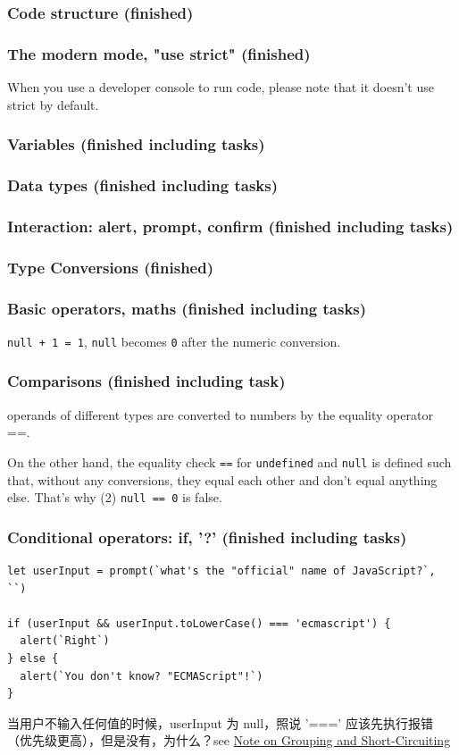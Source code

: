 \documentclass[a4paper, 12pt]{article}
\begin{document}
\subsubsection{Code structure (finished)}
\subsubsection{The modern mode, "use strict" (finished)}
When you use a developer console to run code, please note that it doesn't use strict by default.

\subsubsection{Variables (finished including tasks)}

\subsubsection{Data types (finished including tasks)}

\subsubsection{Interaction: alert, prompt, confirm (finished including tasks)}
\subsubsection{Type Conversions (finished)}
\subsubsection{Basic operators, maths (finished including tasks)}
\verb|null + 1 = 1|, \verb|null| becomes \verb|0| after the numeric conversion.

\subsubsection{Comparisons (finished including task)}
operands of different types are converted to numbers by the equality operator ==.

On the other hand, the equality check \verb|==| for \verb|undefined| and \verb|null| is defined such that, without any conversions, they equal each other and don't equal anything else. That's why (2) \verb|null == 0| is false.

\subsubsection{Conditional operators: if, '?' (finished including tasks)}
\begin{verbatim}
let userInput = prompt(`what's the "official" name of JavaScript?`, ``)

if (userInput && userInput.toLowerCase() === 'ecmascript') {
  alert(`Right`)
} else {
  alert(`You don't know? "ECMAScript"!`)
}
\end{verbatim}
当用户不输入任何值的时候，userInput 为 null，照说 '===' 应该先执行报错（优先级更高），但是没有，为什么？see \href{https://developer.mozilla.org/en-US/docs/Web/JavaScript/Reference/Operators/Operator_Precedence#Note_on_grouping_and_short-circuiting}{Note on Grouping and Short-Circuiting}
\end{document}
